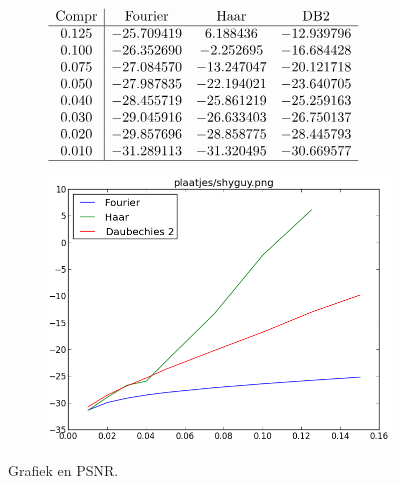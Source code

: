 \begin{figure}
  \centering
  \begin{subfigure}[t]{0.48\textwidth}
    \centering
    \vspace{10pt}
    \begingroup

    \renewcommand*{\arraystretch}{1.5}
    $\begin{array}{c | c c c c}
      \text{Compr} & \text{Fourier} & \text{Haar} & \text{DB2} \\ \hline
      0.125 & -25.709419 & 6.188436 & -12.939796 \\
      0.100 & -26.352690 & -2.252695 & -16.684428 \\
      0.075 & -27.084570 & -13.247047 & -20.121718 \\
      0.050 & -27.987835 & -22.194021 & -23.640705 \\
      0.040 & -28.455719 & -25.861219 & -25.259163 \\
      0.030 & -29.045916 & -26.633403 & -26.750137 \\
      0.020 & -29.857696 & -28.858775 & -28.445793 \\
      0.010 & -31.289113 & -31.320495 & -30.669577 \\ \hline
    \end{array}$
    \endgroup
  \end{subfigure}
  \begin{subfigure}[t]{0.48\textwidth}
    \centering
    \vspace{0pt}
    \includegraphics[height=\textwidth]{plaatjes/grafiek_shyguy_0_15-0_01.png}
  \end{subfigure}
  \caption{Grafiek en PSNR.}
\end{figure}
